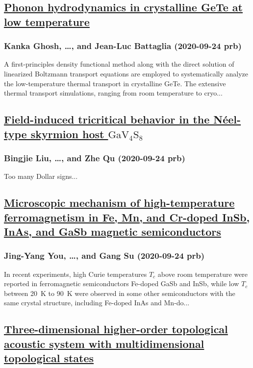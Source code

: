 \subsection*{\href{http://link.aps.org/doi/10.1103/PhysRevB.102.094311}{Phonon hydrodynamics in crystalline GeTe at low temperature}}
\subsubsection*{Kanka Ghosh, \dots, and Jean-Luc Battaglia (2020-09-24 prb)}
A first-principles density functional method along with the direct solution of linearized Boltzmann transport equations are employed to systematically analyze the low-temperature thermal transport in crystalline GeTe. The extensive thermal transport simulations, ranging from room temperature to cryo...
\subsection*{\href{http://link.aps.org/doi/10.1103/PhysRevB.102.094431}{Field-induced tricritical behavior in the Néel-type skyrmion host ${\mathrm{GaV}}_{4}{\mathrm{S}}_{8}$}}
\subsubsection*{Bingjie Liu, \dots, and Zhe Qu (2020-09-24 prb)}
Too many Dollar signs...
\subsection*{\href{http://link.aps.org/doi/10.1103/PhysRevB.102.094432}{Microscopic mechanism of high-temperature ferromagnetism in Fe, Mn, and Cr-doped InSb, InAs, and GaSb magnetic semiconductors}}
\subsubsection*{Jing-Yang You, \dots, and Gang Su (2020-09-24 prb)}
In recent experiments, high Curie temperatures ${T}_{c}$ above room temperature were reported in ferromagnetic semiconductors Fe-doped GaSb and InSb, while low ${T}_{c}$ between 20 K to 90 K were observed in some other semiconductors with the same crystal structure, including Fe-doped InAs and Mn-do...
\subsection*{\href{http://link.aps.org/doi/10.1103/PhysRevB.102.104113}{Three-dimensional higher-order topological acoustic system with multidimensional topological states}}
